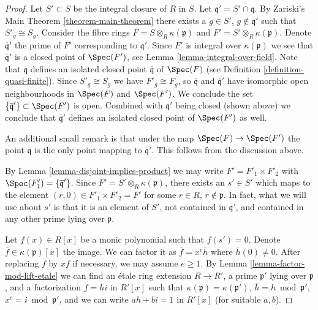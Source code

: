 \begin{proof}
Let $S' \subset S$ be the integral closure of $R$ in $S$.
Let $\mathfrak q' = S' \cap \mathfrak q$.
By Zariski's Main Theorem \ref{theorem-main-theorem}
there exists a $g \in S'$, $g \not \in \mathfrak q'$ such
that $S'_g \cong S_g$. Consider the fibre rings
$F = S \otimes_R \kappa(\mathfrak p)$ and
$F' = S' \otimes_R \kappa(\mathfrak p)$. Denote $\overline{\mathfrak q}'$
the prime of $F'$ corresponding to $\mathfrak q'$. Since
$F'$ is integral over $\kappa(\mathfrak p)$ we see
that $\overline{\mathfrak q}'$ is a closed point of
$\Spec(F')$, see Lemma \ref{lemma-integral-over-field}.
Note that $\mathfrak q$ defines an isolated closed point
$\overline{\mathfrak q}$ of
$\Spec(F)$ (see Definition \ref{definition-quasi-finite}).
Since $S'_g \cong S_g$ we have $F'_g \cong F_g$,
so $\overline{\mathfrak q}$ and $\overline{\mathfrak q}'$
have isomorphic open neighbourhoods in $\Spec(F)$
and $\Spec(F')$. We conclude the set
$\{\overline{\mathfrak q}'\} \subset \Spec(F')$ is
open. Combined with $\mathfrak q'$ being closed (shown above)
we conclude that $\overline{\mathfrak q}'$ defines
an isolated closed point of $\Spec(F')$ as well.

\medskip\noindent
An additional small remark is that under the map
$\Spec(F) \to \Spec(F')$ the point $\overline{\mathfrak q}$
is the only point mapping to $\overline{\mathfrak q}'$. This follows
from the discussion above.

\medskip\noindent
By Lemma \ref{lemma-disjoint-implies-product} we may write
$F' = F'_1 \times F'_2$ with
$\Spec(F'_1) = \{\overline{\mathfrak q}'\}$.
Since $F' = S' \otimes_R \kappa(\mathfrak p)$, there
exists an $s' \in S'$ which maps to the element
$(r, 0) \in F'_1 \times F'_2 = F'$ for some $r \in R$, $r \not \in \mathfrak p$.
In fact, what we will use about $s'$ is that it is an element of $S'$,
not contained in $\mathfrak q'$, and contained in any other prime
lying over $\mathfrak p$.

\medskip\noindent
Let $f(x) \in R[x]$ be a monic polynomial such that $f(s') = 0$.
Denote $\overline{f} \in \kappa(\mathfrak p)[x]$ the image.
We can factor it as $\overline{f} = x^e \overline{h}$ where
$\overline{h}(0) \not = 0$. After replacing $f$
by $x f$ if necessary, we may assume $e \geq 1$.
By Lemma \ref{lemma-factor-mod-lift-etale}
we can find an \'etale ring extension $R \to R'$,
a prime $\mathfrak p'$ lying over $\mathfrak p$, and
a factorization $f = h i$ in $R'[x]$ such that
$\kappa(\mathfrak p) = \kappa(\mathfrak p')$,
$\overline{h} = h \bmod \mathfrak p'$,
$x^e = i \bmod \mathfrak p'$, and
we can write $a h + b i = 1$ in $R'[x]$ (for suitable $a, b$).


\end{proof}
